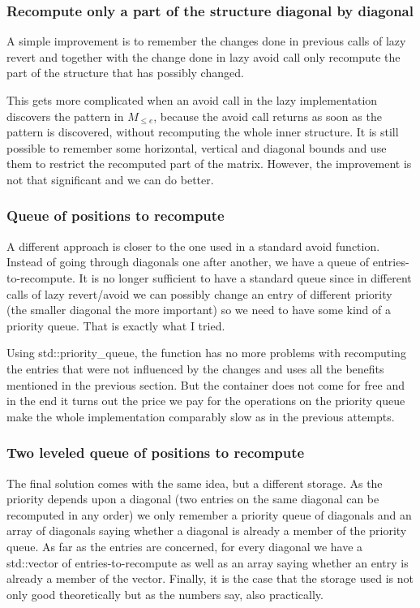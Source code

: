 \subsubsection{Recompute only a part of the structure diagonal by diagonal}
A simple improvement is to remember the changes done in previous calls of lazy revert and together with the change done in lazy avoid call only recompute the part of the structure that has possibly changed.

This gets more complicated when an avoid call in the lazy implementation discovers the pattern in $M_{\leq e}$, because the avoid call returns as soon as the pattern is discovered, without recomputing the whole inner structure. It is still possible to remember some horizontal, vertical and diagonal bounds and use them to restrict the recomputed part of the matrix. However, the improvement is not that significant and we can do better.
\subsubsection{Queue of positions to recompute}
A different approach is closer to the one used in a standard avoid function. Instead of going through diagonals one after another, we have a queue of entries-to-recompute. It is no longer sufficient to have a standard queue since in different calls of lazy revert/avoid we can possibly change an entry of different priority (the smaller diagonal the more important) so we need to have some kind of a priority queue. That is exactly what I tried.

Using std::priority\_queue, the function has no more problems with recomputing the entries that were not influenced by the changes and uses all the benefits mentioned in the previous section. But the container does not come for free and in the end it turns out the price we pay for the operations on the priority queue make the whole implementation comparably slow as in the previous attempts.
\subsubsection{Two leveled queue of positions to recompute}
The final solution comes with the same idea, but a different storage. As the priority depends upon a diagonal (two entries on the same diagonal can be recomputed in any order) we only remember a priority queue of diagonals and an array of diagonals saying whether a diagonal is already a member of the priority queue. As far as the entries are concerned, for every diagonal we have a std::vector of entries-to-recompute as well as an array saying whether an entry is already a member of the vector. Finally, it is the case that the storage used is not only good theoretically but as the numbers say, also practically.

